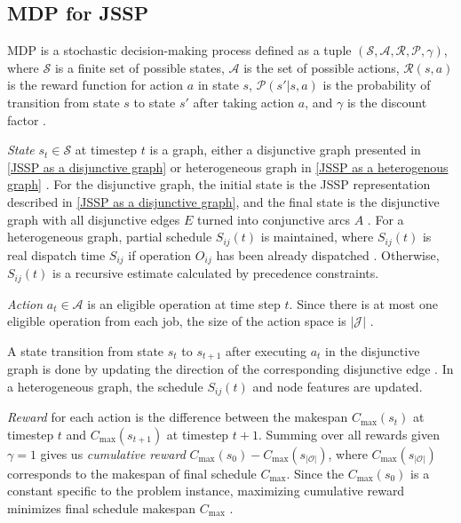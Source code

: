 \subsection{MDP for JSSP} \label{MDP for JSSP}

MDP is a stochastic decision-making process defined as a tuple $(\mathcal{S}, \mathcal{A}, \mathcal{R}, \mathcal{P}, \gamma)$, where $\mathcal{S}$ is a finite set of possible states, $\mathcal{A}$ is the set of possible actions, $\mathcal{R}(s, a)$ is the reward function for action $a$ in state $s$,  $\mathcal{P} (s' | s, a)$ is the probability of transition from state $s$ to state $s'$ after taking action $a$, and $\gamma$ is the discount factor \cite{10226873, jssp_rl_env}. 
\par
\textit{State} $s_t \in \mathcal{S}$ at timestep $t$ is a graph, either a disjunctive graph presented in \ref{JSSP as a disjunctive graph} \cite{zhang2020learning} or heterogeneous graph in \ref{JSSP as a heterogenous graph} \cite{10226873}. For the disjunctive graph, the initial state is the JSSP representation described in \ref{JSSP as a disjunctive graph}, and the final state is the disjunctive graph with all disjunctive edges $E$ turned into conjunctive arcs $A$ \cite{zhang2020learning}. For a heterogeneous graph, partial schedule $S_{ij}(t)$ is maintained, where $S_{ij}(t)$ is real dispatch time $S_{ij}$ if operation $O_{ij}$ has been already dispatched \cite{9826438}. Otherwise, $S_{ij}(t)$ is a recursive estimate calculated by precedence constraints.
\par
\textit{Action} $a_t \in \mathcal{A}$ is an eligible operation at time step $t$. Since there is at most one eligible operation from each job, the size of the action space is $\left|\mathcal{J}\right|$ \cite{zhang2020learning}.
\par
A state transition from state $s_t$ to $s_{t+1}$ after executing $a_t$ in the disjunctive graph is done by updating the direction of the corresponding disjunctive edge \cite{zhang2020learning}. In a heterogeneous graph, the schedule $S_{ij}(t)$ and node features are updated.

\textit{Reward} for each action is the difference between the makespan $C_\text{max}(s_t)$ at timestep $t$ and $C_\text{max}(s_{t+1})$ at timestep $t+1$. Summing over all rewards given $\gamma = 1$ gives us \textit{cumulative reward} $C_\text{max}(s_0) - C_\text{max}(s_{\left|\mathcal{O}\right|})$, where $C_\text{max}(s_{\left|\mathcal{O}\right|})$ corresponds to the makespan of final schedule $C_\text{max}$. Since the $C_\text{max}(s_0)$ is a constant specific to the problem instance, maximizing cumulative reward minimizes final schedule makespan $C_\text{max}$ \cite{zhang2020learning, 9826438, 10226873}. 

